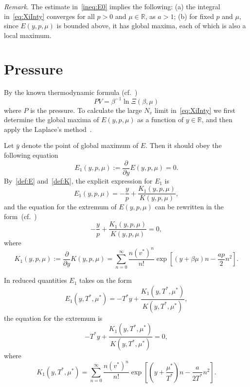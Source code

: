 \documentclass[12pt]{article}
\numberwithin{equation}{section}
\begin{document}
	\textit{Remark}. The estimate in~\eqref{ineq:E0} implies the following: (a) the integral in~\eqref{eq:XiInty} converges for all $p>0$ and $\mu \in \mathbb{R}$, as $a>1$; (b) for fixed $p$ and $\mu$, since $E(y,p,\mu)$ is bounded above, it has global maxima, each of which is also a local maximum.
	
	
	\section{Pressure}
	By the known thermodynamic formula (cf.~\cite[(2.16)]{KKD20})
	\begin{equation}
		\label{def:eos}
		P V = \beta^{-1} \ln \Xi(\beta, \mu)
	\end{equation}
	where $P$ is the pressure. To calculate the large $N_v$ limit in~\eqref{eq:XiInty} we first determine the global maxima of $E(y,p,\mu)$ as a function of $y \in \mathbb{R}$, and then apply the Laplace's method~\cite{Fedoryuk89}.
	
	Let $\bar{y}$ denote the point of global maximum of $E$. Then it should obey the following equation
	\begin{equation}
		\label{def:E1}
		E_1(y,p,\mu) := \frac{\partial}{\partial y} E(y,p,\mu) = 0.
	\end{equation}
	By~\eqref{def:E} and~\eqref{def:K}, the explicit expression for $E_1$ is
	\begin{equation}
		E_1(y,p,\mu) = -\frac{y}{p} + \frac{K_1(y,p,\mu)}{K(y,p,\mu)},
	\end{equation}
	and the equation for the extremum of $E(y,p,\mu)$ can be rewritten in the form~(cf.~\cite[(2.19)]{KKD20})
	\begin{equation}
		\label{eq:bar_y}
		-\frac{y}{p} + \frac{K_1(y,p,\mu)}{K(y,p,\mu)} = 0,
	\end{equation}
	where
	\begin{equation}
		K_1(y,p,\mu) := \frac{\partial}{\partial y} K(y,p,\mu) = \sum_{n=0}^{\infty} \frac{n (v^*)^n}{n!} \exp[(y+\beta\mu)n - \frac{ap}{2}n^2].
	\end{equation}
	
	\begin{mdframed}[linecolor=black,linewidth=1pt,leftline=true]
		In reduced quantities $E_1$ takes on the form
		\begin{equation}
			E_1(y,T^*,\mu^*) = -T^* y + \frac{K_1(y,T^*,\mu^*)}{K(y,T^*,\mu^*)},
		\end{equation}
		the equation for the extremum is
		\begin{equation}
			-T^* y + \frac{K_1(y,T^*,\mu^*)}{K(y,T^*,\mu^*)} = 0,
		\end{equation}
		where
		\begin{equation}
			K_1(y,T^*,\mu^*) = \sum_{n=0}^{\infty} \frac{n (v^*)^n}{n!} \exp[\left(y+\frac{\mu^*}{T^*}\right)n - \frac{a}{2T^*}n^2].
		\end{equation}
	\end{mdframed}
	
\end{document}
